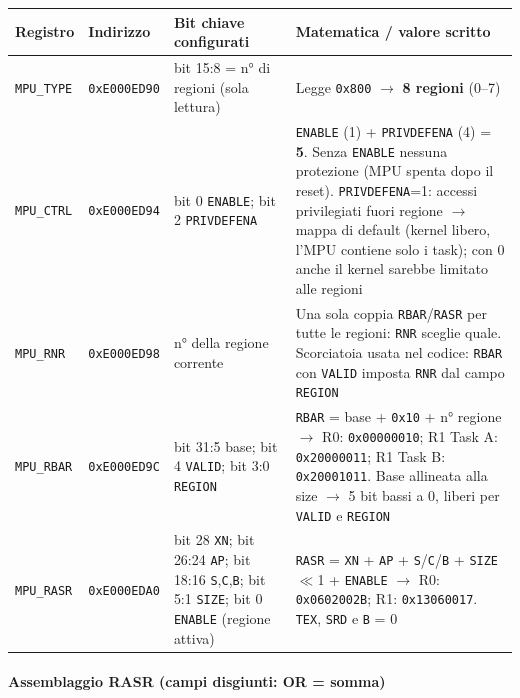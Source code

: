 \begin{table}[htbp]
\centering
\begin{tabular}{|l|l|p{4cm}|p{6.5cm}|}
\hline
\textbf{Registro} & \textbf{Indirizzo} & \textbf{Bit chiave configurati} & \textbf{Matematica / valore scritto} \\
\hline
\texttt{MPU\_TYPE} & \texttt{0xE000ED90} & bit 15:8 = n° di regioni (sola lettura) & Legge \texttt{0x800} $\rightarrow$ \textbf{8 regioni} (0--7) \\
\hline
\texttt{MPU\_CTRL} & \texttt{0xE000ED94} & bit 0 \texttt{ENABLE}; bit 2 \texttt{PRIVDEFENA} & \texttt{ENABLE} (1) + \texttt{PRIVDEFENA} (4) = \textbf{5}. Senza \texttt{ENABLE} nessuna protezione (MPU spenta dopo il reset). \texttt{PRIVDEFENA}=1: accessi privilegiati fuori regione $\rightarrow$ mappa di default (kernel libero, l'MPU contiene solo i task); con 0 anche il kernel sarebbe limitato alle regioni \\
\hline
\texttt{MPU\_RNR} & \texttt{0xE000ED98} & n° della regione corrente & Una sola coppia \texttt{RBAR}/\texttt{RASR} per tutte le regioni: \texttt{RNR} sceglie quale. Scorciatoia usata nel codice: \texttt{RBAR} con \texttt{VALID} imposta \texttt{RNR} dal campo \texttt{REGION} \\
\hline
\texttt{MPU\_RBAR} & \texttt{0xE000ED9C} & bit 31:5 base; bit 4 \texttt{VALID}; bit 3:0 \texttt{REGION} & \texttt{RBAR} = base + \texttt{0x10} + n° regione $\rightarrow$ R0: \texttt{0x00000010}; R1 Task A: \texttt{0x20000011}; R1 Task B: \texttt{0x20001011}. Base allineata alla size $\rightarrow$ 5 bit bassi a 0, liberi per \texttt{VALID} e \texttt{REGION} \\
\hline
\texttt{MPU\_RASR} & \texttt{0xE000EDA0} & bit 28 \texttt{XN}; bit 26:24 \texttt{AP}; bit 18:16 \texttt{S},\texttt{C},\texttt{B}; bit 5:1 \texttt{SIZE}; bit 0 \texttt{ENABLE} (regione attiva) & \texttt{RASR} = \texttt{XN} + \texttt{AP} + \texttt{S}/\texttt{C}/\texttt{B} + \texttt{SIZE}$\ll$1 + \texttt{ENABLE} $\rightarrow$ R0: \texttt{0x0602002B}; R1: \texttt{0x13060017}. \texttt{TEX}, \texttt{SRD} e \texttt{B} = 0 \\
\hline
\end{tabular}
\end{table}

\paragraph*{Assemblaggio RASR (campi disgiunti: OR = somma)}

